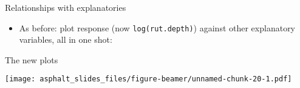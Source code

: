 \begin{frame}[fragile]{Relationships with explanatories}
\protect\hypertarget{relationships-with-explanatories}{}
\begin{itemize}
\tightlist
\item
  As before: plot response (now \texttt{log(rut.depth)}) against other
  explanatory variables, all in one shot:
\end{itemize}

\begin{Shaded}
\begin{Highlighting}[]
\OperatorTok{\%\textgreater{}\%}
\StringTok{  }\NormalTok{(}\OperatorTok{\%\textgreater{}\%}\StringTok{ }
\StringTok{  }\NormalTok{(}
    \OperatorTok{:}
    \NormalTok{, }
\NormalTok{  ) }\OperatorTok{\%\textgreater{}\%}
\StringTok{  }\NormalTok{(}\NormalTok{(} \OperatorTok{+}\StringTok{ }\NormalTok{() }\OperatorTok{+}
\StringTok{  }\NormalTok{(}\OperatorTok{\textasciitilde{}} \NormalTok{) {-}\textgreater{}}\StringTok{ }
\end{Highlighting}
\end{Shaded}
\end{frame}

\begin{frame}[fragile]{The new plots}
\protect\hypertarget{the-new-plots}{}
\begin{Shaded}
\begin{Highlighting}[]
\end{Highlighting}
\end{Shaded}

\texttt{[image: asphalt\_slides\_files/figure-beamer/unnamed-chunk-20-1.pdf]}
\end{frame}

